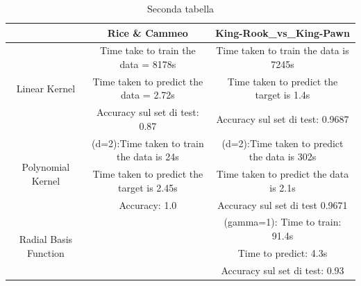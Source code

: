 \documentclass{article}
\begin{document}
  \begin{table}[htbp]
	\centering
	\begin{tabular}{|c|c|c|}
	  \hline
	  \multicolumn{1}{|c|}{} & \multicolumn{1}{c|}{Rice \& Cammeo} & \multicolumn{1}{c|}{King-Rook\_vs\_King-Pawn} \\
	  \hline
	  \multirow{3}{*}{Linear Kernel} & Time take to train the data = 8178s   & Time taken to train the data is 7245s\\
	  & Time taken to predict the data = 2.72s & Time taken to predict the target is 1.4s\\
	  & Accuracy sul set di test: 0.87 & Accuracy sul set di test: 0.9687\\
	  \hline
	  \multirow{3}{*}{Polynomial Kernel} & (d=2):Time taken to train the data is 24s& (d=2):Time taken to predict the data is 302s \\
	  & Time taken to predict the target is 2.45s& Time taken to predict the data is 2.1s\\
	  & Accuracy: 1.0 & Accuracy sul set di test 0.9671\\
	  \hline
	  \multirow{3}{*}{Radial Basis Function} &&(gamma=1): Time to train: 91.4s\\
	  && Time to predict: 4.3s \\
	  && Accuracy sul set di test: 0.93 \\
	  \hline
	\end{tabular}
	\caption{Seconda tabella}
  \end{table}
\end{document}

